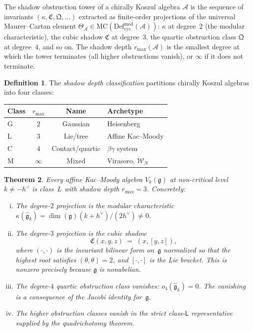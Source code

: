 \documentclass[11pt]{article}
\theoremstyle{plain}
\newtheorem{theorem}{Theorem}[section]
\theoremstyle{definition}
\newtheorem{definition}[theorem]{Definition}
\theoremstyle{remark}
\newcommand{\fg}{\mathfrak{g}}
\newcommand{\ghat}{\widehat{\fg}}
\numberwithin{equation}{section}
\begin{document}
The shadow obstruction tower of a chirally Koszul algebra
$\mathcal{A}$ is the sequence of invariants
$(\kappa, \mathfrak{C}, \mathfrak{Q}, \ldots)$
extracted as finite-order projections of the universal
Maurer--Cartan element
$\Theta_{\mathcal{A}} \in \mathrm{MC}(\mathrm{Def}_{\mathrm{cyc}}^{\mathrm{mod}}(\mathcal{A}))$:
$\kappa$ at degree~$2$ (the modular characteristic),
the cubic shadow $\mathfrak{C}$ at degree~$3$,
the quartic obstruction class $\mathfrak{Q}$ at degree~$4$,
and so on. The shadow depth $r_{\max}(\mathcal{A})$ is the
smallest degree at which the tower terminates
(all higher obstructions vanish), or $\infty$ if it does
not terminate.

\begin{definition}\label{def:shadow-classes}
The \emph{shadow depth classification} partitions chirally
Koszul algebras into four classes:
\begin{center}
\renewcommand{\arraystretch}{1.3}
\begin{tabular}{lccl}
\toprule
\textbf{Class} & $r_{\max}$ & \textbf{Name} &
 \textbf{Archetype} \\
\midrule
G & $2$ & Gaussian & Heisenberg \\
L & $3$ & Lie/tree & Affine Kac--Moody \\
C & $4$ & Contact/quartic & $\beta\gamma$ system \\
M & $\infty$ & Mixed & Virasoro, $\mathcal{W}_N$ \\
\bottomrule
\end{tabular}
\end{center}
\end{definition}

\begin{theorem}\label{thm:km-class-L}
Every affine Kac--Moody algebra $V_k(\fg)$ at
non-critical level $k \neq -h^\vee$ is class~$L$
with shadow depth $r_{\max} = 3$.
Concretely:
\begin{enumerate}[(i)]
\item The degree-$2$ projection is the modular
 characteristic $\kappa(\ghat_k) = \dim(\fg)(k{+}h^\vee)/(2h^\vee) \neq 0$.
\item The degree-$3$ projection is the cubic shadow
 \begin{equation}\label{eq:cubic-shadow}
 \mathfrak{C}(x, y, z)
 \;=\; (x, [y, z]),
 \end{equation}
 where $(\cdot, \cdot)$ is the invariant bilinear form
 on~$\fg$ normalized so that the highest root
 satisfies $(\theta, \theta) = 2$, and
 $[\cdot, \cdot]$ is the Lie bracket.
 This is nonzero precisely because $\fg$ is nonabelian.
\item The degree-$4$ quartic obstruction class vanishes:
 $o_4(\ghat_k) = 0$. The vanishing is a consequence
 of the Jacobi identity for~$\fg$.
\item The higher obstruction classes vanish in the strict
 class-\(\mathsf L\) representative supplied by the quadrichotomy
 theorem.
\end{enumerate}
\end{theorem}
\end{document}
